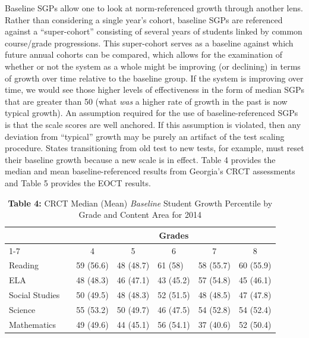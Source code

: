 \documentclass[12pt]{article}
\begin{document}
Baseline SGPs allow one to look at norm-referenced growth through
another lens. Rather than considering a single year's cohort, baseline
SGPs are referenced against a ``super-cohort'' consisting of several
years of students linked by common course/grade progressions. This
super-cohort serves as a baseline against which future annual cohorts
can be compared, which allows for the examination of whether or not the
system as a whole might be improving (or declining) in terms of growth
over time relative to the baseline group. If the system is improving
over time, we would see those higher levels of effectiveness in the form
of median SGPs that are greater than 50 (what \emph{was} a higher rate
of growth in the past is now typical growth). An assumption required for
the use of baseline-referenced SGPs is that the scale scores are well
anchored. If this assumption is violated, then any deviation from
``typical'' growth may be purely an artifact of the test scaling
procedure. States transitioning from old test to new tests, for example,
must reset their baseline growth because a new scale is in effect. Table
4 provides the median and mean baseline-referenced results from
Georgia's CRCT assessments and Table 5 provides the EOCT results.

\begin{table}[H]
\caption*{\textbf{Table 4:} CRCT Median (Mean) \emph{Baseline} Student Growth Percentile by Grade and Content Area for 2014\label{}} 
\begin{center}
\begin{tabular}{lclllll}
\hline\hline
\multicolumn{1}{c}{\bfseries }&\multicolumn{1}{c}{\bfseries }&\multicolumn{5}{c}{\bfseries Grades}\tabularnewline
\cline{1-7}
\multicolumn{1}{c}{Content Area}&\multicolumn{1}{c}{}&\multicolumn{1}{c}{4}&\multicolumn{1}{c}{5}&\multicolumn{1}{c}{6}&\multicolumn{1}{c}{7}&\multicolumn{1}{c}{8}\tabularnewline
\hline
Reading&&59 (56.6)&48 (48.7)&61 (58)&58 (55.7)&60 (55.9)\tabularnewline
ELA&&48 (48.3)&46 (47.1)&43 (45.2)&57 (54.8)&45 (46.1)\tabularnewline
Social Studies&&50 (49.5)&48 (48.3)&52 (51.5)&48 (48.5)&47 (47.8)\tabularnewline
Science&&55 (53.2)&50 (49.7)&46 (47.5)&54 (52.8)&54 (52.4)\tabularnewline
Mathematics&&49 (49.6)&44 (45.1)&56 (54.1)&37 (40.6)&52 (50.4)\tabularnewline
\hline
\end{tabular}\end{center}

\end{table}
\end{document}
